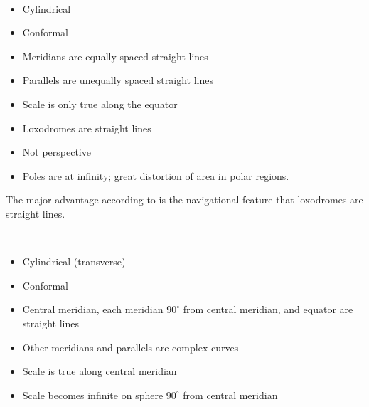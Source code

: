 \begin{enumerate}

 \hfill \\
    \begin{itemize}
        \item Cylindrical
        \item Conformal
        \item Meridians are equally spaced straight lines
        \item Parallels are unequally spaced straight lines
        \item Scale is only true along the equator
        \item Loxodromes are straight lines
        \item Not perspective
        \item Poles are at infinity; great distortion of area in polar regions.
    \end{itemize}

    The major advantage according to \citeauthor{Synder1987} is the navigational feature that loxodromes are straight lines.

 \hfill \\
    \begin{itemize}
        \item Cylindrical (transverse)
        \item Conformal
        \item Central meridian, each meridian $90^{\circ}$ from central meridian, and equator are straight lines
        \item Other meridians and parallels are complex curves
        \item Scale is true along central meridian
        \item Scale becomes infinite on sphere $90^{\circ}$ from central meridian
    \end{itemize}
\end{enumerate}









